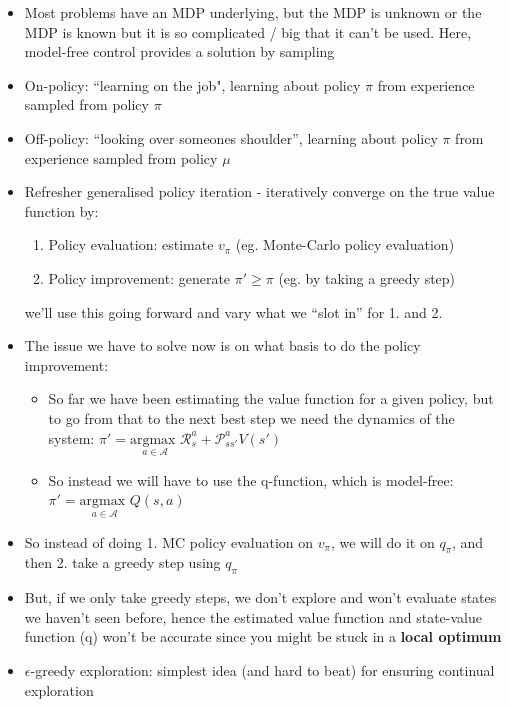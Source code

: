\documentclass{article}
\begin{document}
\begin{itemize}
    \item Most problems have an MDP underlying, but the MDP is unknown or the MDP is known but it is so complicated / big that it can't be used. Here, model-free control provides a solution by sampling
    \item On-policy: ``learning on the job", learning about policy $\pi$ from experience sampled from policy $\pi$
    \item Off-policy: ``looking over someones shoulder'', learning about policy $\pi$ from experience sampled from policy $\mu$
    \item Refresher generalised policy iteration - iteratively converge on the true value function by:
    \begin{enumerate}
        \item Policy evaluation: estimate $v_\pi$ (eg. Monte-Carlo policy evaluation)
        \item Policy improvement: generate $\pi'\geq \pi$ (eg. by taking a greedy step)
    \end{enumerate}
    we'll use this going forward and vary what we ``slot in'' for 1. and 2. 
    \item The issue we have to solve now is on what basis to do the policy improvement:
    \begin{itemize}
        \item So far we have been estimating the value function for a given policy, but to go from that to the next best step we need the dynamics of the system: $\pi'=\underset{a \in \mathcal{A}}{\text{argmax }} \mathcal{R}^a_s+\mathcal{P}_{ss'}^a V(s')$
        \item So instead we will have to use the q-function, which is model-free: $\pi'=\underset{a \in \mathcal{A}}{\text{argmax }} Q(s, a)$
    \end{itemize}
    \item So instead of doing 1. MC policy evaluation on $v_\pi$, we will do it on $q_\pi$, and then 2. take a greedy step using $q_\pi$
    \item But, if we only take greedy steps, we don't explore and won't evaluate states we haven't seen before, hence the estimated value function and state-value function (q) won't be accurate since you might be stuck in a \textbf{local optimum}
    \item $\epsilon$-greedy exploration: simplest idea (and hard to beat) for ensuring continual exploration
    \begin{itemize}

\end{itemize}
\end{itemize}
\end{document}
